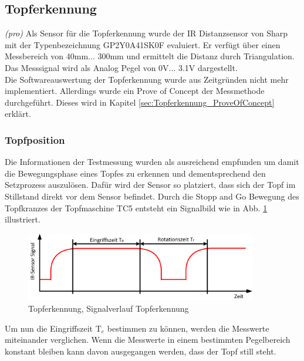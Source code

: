 \subsection{Topferkennung} \label{sec:Topferkennung}
\textit{(pro)} Als Sensor für die Topferkennung wurde der IR Distanzsensor von Sharp mit der Typenbezeichnung GP2Y0A41SK0F evaluiert. Er verfügt über einen Messbereich von 40mm... 300mm und ermittelt die Distanz durch Triangulation. Das Messsignal wird als Analog Pegel von 0V... 3.1V dargestellt.\\
Die Softwareauswertung der Topferkennung wurde aus Zeitgründen nicht mehr implementiert. Allerdings wurde ein Prove of Concept der Messmethode durchgeführt. Dieses wird in Kapitel \ref{sec:Topferkennung_ProveOfConcept} erklärt.



\subsubsection{Topfposition}
Die Informationen der Testmessung wurden als ausreichend empfunden um damit die Bewegungsphase eines Topfes zu erkennen und dementsprechend den Setzprozess auszulösen. Dafür wird der Sensor so platziert, dass sich der Topf im Stillstand direkt vor dem Sensor befindet. Durch die Stopp and Go Bewegung des Topfkranzes der Topfmaschine TC5 entsteht ein Signalbild wie in Abb. \ref{fig:Signalbild_Topferkennung} illustriert.\\

\begin{figure}[H]
	\includegraphics[width=0.9\textwidth]{Illustrationen/6-Umsetzung/Topferkennung_Messsignal.png}
	\caption{Topferkennung, Signalverlauf Topferkennung}
	\label{fig:Signalbild_Topferkennung}
\end{figure}

Um nun die Eingriffszeit T$_{e}$ bestimmen zu können, werden die Messwerte miteinander verglichen. Wenn die Messwerte in einem bestimmten Pegelbereich konstant bleiben kann davon ausgegangen werden, dass der Topf still steht.

